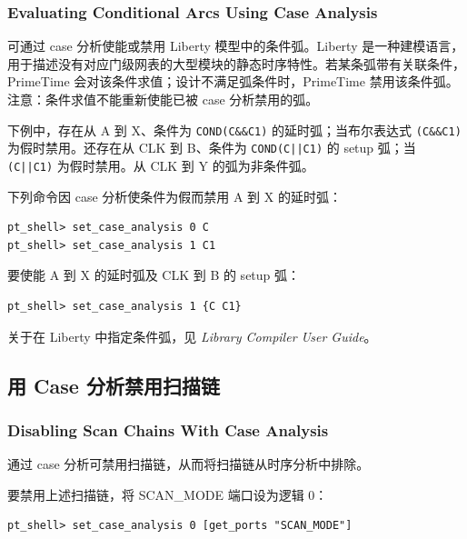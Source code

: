 \subsubsection*{Evaluating Conditional Arcs Using Case Analysis}

可通过 case 分析使能或禁用 Liberty 模型中的条件弧。Liberty 是一种建模语言，用于描述没有对应门级网表的大型模块的静态时序特性。若某条弧带有关联条件，PrimeTime 会对该条件求值；设计不满足弧条件时，PrimeTime 禁用该条件弧。注意：条件求值不能重新使能已被 case 分析禁用的弧。

下例中，存在从 A 到 X、条件为 \texttt{COND(C\&\&C1)} 的延时弧；当布尔表达式 \texttt{(C\&\&C1)} 为假时禁用。还存在从 CLK 到 B、条件为 \texttt{COND(C||C1)} 的 setup 弧；当 \texttt{(C||C1)} 为假时禁用。从 CLK 到 Y 的弧为非条件弧。


下列命令因 case 分析使条件为假而禁用 A 到 X 的延时弧：
\begin{lstlisting}
pt_shell> set_case_analysis 0 C
pt_shell> set_case_analysis 1 C1
\end{lstlisting}

要使能 A 到 X 的延时弧及 CLK 到 B 的 setup 弧：
\begin{lstlisting}
pt_shell> set_case_analysis 1 {C C1}
\end{lstlisting}

关于在 Liberty 中指定条件弧，见 \textit{Library Compiler User Guide}。

\subsection{用 Case 分析禁用扫描链}
\subsubsection*{Disabling Scan Chains With Case Analysis}

通过 case 分析可禁用扫描链，从而将扫描链从时序分析中排除。


要禁用上述扫描链，将 SCAN\_MODE 端口设为逻辑 0：
\begin{lstlisting}
pt_shell> set_case_analysis 0 [get_ports "SCAN_MODE"]
\end{lstlisting}

